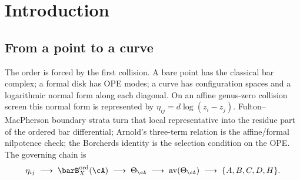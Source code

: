\providecommand{\ChirAlg}{\operatorname{ChirAlg}}
\providecommand{\HTQFT}{\operatorname{HT\text{-}QFT}}
\providecommand{\Phihol}{\Phi_{\mathrm{hol}}}
\providecommand{\Phicy}{\Phi_{\mathrm{CY}}}
\providecommand{\GRTone}{\operatorname{GRT}_{1}}
\providecommand{\kBKM}{\kappa_{\mathrm{BKM}}}
\providecommand{\kch}{\kappa_{\mathrm{ch}}}
\providecommand{\kfib}{\kappa_{\mathrm{fiber}}}
\providecommand{\kcat}{\kappa_{\mathrm{cat}}}
\providecommand{\Face}{\operatorname{Face}}
\providecommand{\gAE}{\mathfrak{g}_{\cA}^{E_{1}}}
\providecommand{\gAmod}{\mathfrak{g}_{\cA}^{\mathrm{mod}}}

\chapter{Introduction}

\section{From a point to a curve}
\label{sec:volume-one-route}

The order is forced by the first collision. A bare point has the
classical bar complex; a formal disk has OPE modes; a curve has
configuration spaces and a logarithmic normal form along each
diagonal. On an affine genus-zero collision screen this normal form is
represented by \(\eta_{ij}=d\log(z_i-z_j)\). Fulton--MacPherson
boundary strata turn that local representative into the residue part
of the ordered bar differential; Arnold's three-term relation is the
affine/formal nilpotence check; the Borcherds identity is the
selection condition on the OPE. The governing chain is
\[
\eta_{ij}
\;\longrightarrow\;
\barB^{\mathrm{ord}}_X(\cA)
\;\longrightarrow\;
\Theta_\cA
\;\longrightarrow\;
\operatorname{av}(\Theta_\cA)
\;\longrightarrow\;
\{A,B,C,D,H\}.
\]

